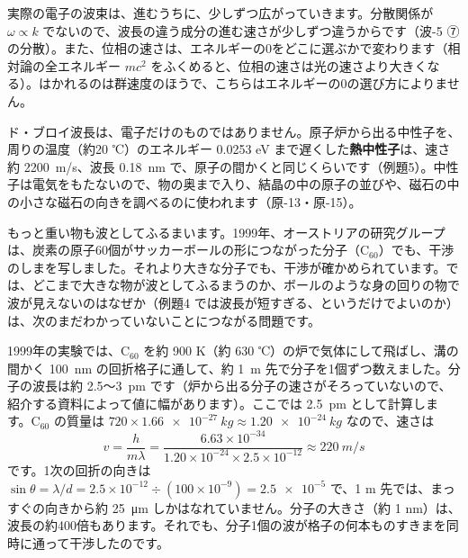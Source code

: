 \begin{seikaku}
実際の電子の波束は、進むうちに、少しずつ広がっていきます。分散関係が $\omega\propto k$ でないので、波長の違う成分の進む速さが少しずつ違うからです（波-5 ⑦の分散）。また、位相の速さは、エネルギーの0をどこに選ぶかで変わります（相対論の全エネルギー $mc^2$ をふくめると、位相の速さは光の速さより大きくなる）。はかれるのは群速度のほうで、こちらはエネルギーの0の選び方によりません。
\end{seikaku}

\label{ph:原-3:sec10}
ド・ブロイ波長は、電子だけのものではありません。原子炉から出る中性子を、周りの温度（約20 ℃）のエネルギー 0.0253 eV まで遅くした\textbf{熱中性子}は、速さ約 \qty{2200}{m/s}、波長 \qty{0.18}{nm} で、原子の間かくと同じくらいです（例題5）。中性子は電気をもたないので、物の奥まで入り、結晶の中の原子の並びや、磁石の中の小さな磁石の向きを調べるのに使われます（原-13・原-15）。

もっと重い物も波としてふるまいます。1999年、オーストリアの研究グループは、炭素の原子60個がサッカーボールの形につながった分子（C$_{60}$）でも、干渉のしまを写しました。それより大きな分子でも、干渉が確かめられています。では、どこまで大きな物が波としてふるまうのか、ボールのような身の回りの物で波が見えないのはなぜか（例題4 では波長が短すぎる、というだけでよいのか）は、次のまだわかっていないことにつながる問題です。

\begin{motto}[4]
1999年の実験では、C$_{60}$ を約 900 K（約 630 ℃）の炉で気体にして飛ばし、溝の間かく \qty{100}{nm} の回折格子に通して、約 \qty{1}{m} 先で分子を1個ずつ数えました。分子の波長は約 \num{2.5}〜\qty{3}{pm} です（炉から出る分子の速さがそろっていないので、紹介する資料によって値に幅があります）。ここでは \qty{2.5}{pm} として計算します。C$_{60}$ の質量は $720\times\qty{1.66e-27}{kg}\approx\qty{1.20e-24}{kg}$ なので、速さは
\[ v=\frac{h}{m\lambda}=\frac{6.63\times10^{-34}}{1.20\times10^{-24}\times2.5\times10^{-12}}\approx\qty{220}{m/s} \]
です。1次の回折の向きは $\sin\theta=\lambda/d=2.5\times10^{-12}\div(100\times10^{-9})=\num{2.5e-5}$ で、1 m 先では、まっすぐの向きから約 \qty{25}{\micro m} しかはなれていません。分子の大きさ（約 1 nm）は、波長の約400倍もあります。それでも、分子1個の波が格子の何本ものすきまを同時に通って干渉したのです。
\end{motto}

